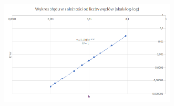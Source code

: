 \begin{samepage}
	
	\begin{figure}[!ht]
		\begin{center}
			\includegraphics[width=0.8\textwidth]{Lab4/charts/zad4/3/error.png}
		\end{center}
	\end{figure}
	\FloatBarrier
\end{samepage} 

\newpage



